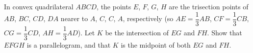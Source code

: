 In convex quadrilateral $ABCD$, the points $E$, $F$, $G$, $H$ are the trisection points of $AB$, $BC$, $CD$, $DA$ nearer to $A$, $C$, $C$, $A$, respectively (so $AE=\dfrac{1}{3}AB$, $CF=\dfrac{1}{3}CB$, $CG=\dfrac{1}{3}CD$, $AH=\dfrac{1}{3}AD$). Let $K$ be the intersection of $EG$ and $FH$. Show that $EFGH$ is a parallelogram, and that $K$ is the midpoint of both $EG$ and $FH$.
